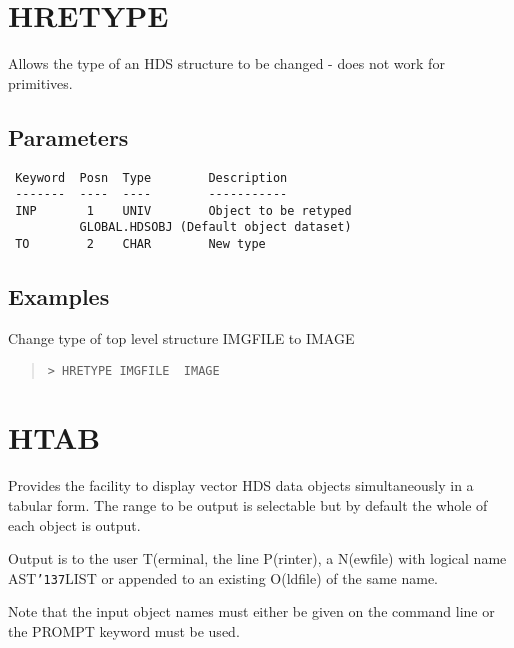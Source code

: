 \documentclass{book}
\renewcommand{\_}{{\tt\char'137}}     %
\begin{document}
\section{HRETYPE}
Allows the type of an HDS structure to be changed - does not work
for primitives.

\subsection{Parameters}
\begin{verbatim}
 Keyword  Posn  Type        Description
 -------  ----  ----        -----------
 INP       1    UNIV        Object to be retyped
          GLOBAL.HDSOBJ (Default object dataset)
 TO        2    CHAR        New type

\end{verbatim}\subsection{Examples}
Change type of top level structure IMGFILE to IMAGE
\begin{quote}\begin{verbatim}
> HRETYPE IMGFILE  IMAGE

\end{verbatim}\end{quote}
\section{HTAB}
Provides the facility to display vector HDS data objects
simultaneously in a tabular form. The range to be output is
selectable but by default the whole of each object is output.

Output is to the user T(erminal, the line P(rinter), a N(ewfile)
with logical name AST\_LIST or appended to an existing O(ldfile)
of the same name.

Note that the input object names must either be given on the
command line or the PROMPT keyword must be used.
\end{document}
